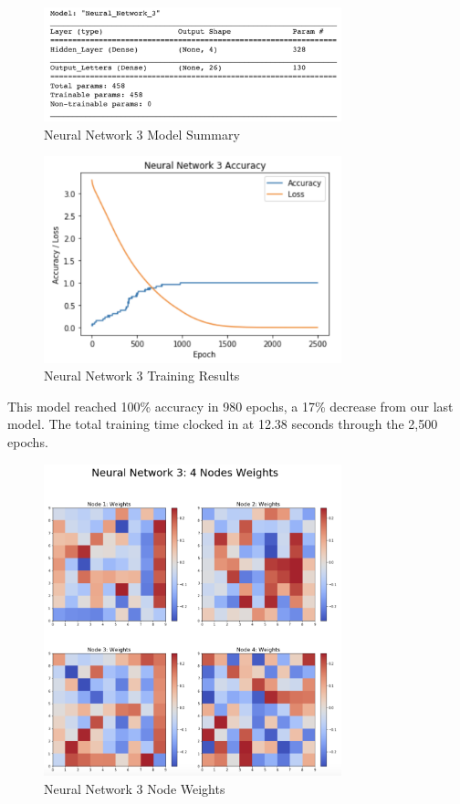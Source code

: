\documentclass[5p,authoryear]{elsarticle}
\begin{document}
\begin{figure}[!htb] \centering
	\includegraphics[width=3.4in]{figures/nn3 sum.png}
	\caption[]{Neural Network 3 Model Summary} 
	\label{test3b} 
\end{figure}

\begin{figure}[!htb] \centering
	\includegraphics[width=3.4in]{figures/nn3 plot.png}
	\caption[]{Neural Network 3 Training Results} 
	\label{test3c}
\end{figure}

This model reached 100\% accuracy in 980 epochs, a 17\% decrease from our last model. 
The total training time clocked in at 12.38 seconds through the 2,500 epochs.

\begin{figure}[!htb] \centering
	\includegraphics[width=3.4in]{figures/nn3_weights.png}
	\caption[]{Neural Network 3 Node Weights} 
	\label{test3d}
\end{figure}
\end{document}
